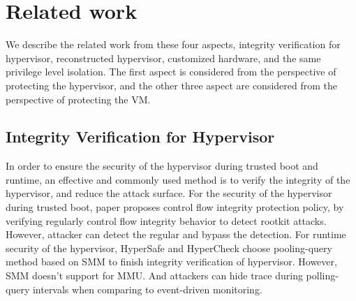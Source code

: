 \documentclass[conference]{IEEEtran}
\begin{document}
\section{Related work}
We describe the related work from these four aspects, integrity verification for hypervisor, reconstructed hypervisor, customized hardware, and the same privilege level isolation. The first aspect is considered from the perspective of protecting the hypervisor, and the other three aspect are considered from the perspective of protecting the VM.


\subsection{Integrity Verification for Hypervisor}
In order to ensure the security of the hypervisor during trusted boot and runtime, an effective and commonly used method is to verify the integrity of the hypervisor, and reduce the attack surface. For the security of the hypervisor during trusted boot, paper \cite{Petroni2007Automated} proposes control flow integrity protection policy, by verifying regularly control flow integrity behavior to detect rootkit attacks. However, attacker can detect the regular and bypass the detection. For runtime security of the hypervisor, HyperSafe \cite{Wang2010HyperSafe} and HyperCheck \cite{Wang2010HyperCheck} choose pooling-query method based on SMM to finish integrity verification of hypervisor. However, SMM doesn't support for MMU. And attackers can hide trace during polling-query intervals when comparing to event-driven monitoring.

\end{document}
